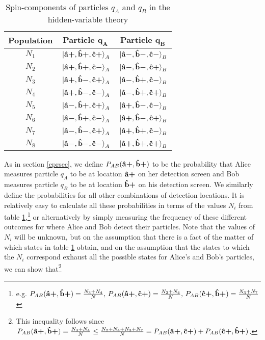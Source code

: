       \begin{table}[ht]
      \caption{Spin-components of particles $q_A$ and $q_B$ in the hidden-variable theory}
      \centering
      \begin{tabular}{c c c} 
      \\ 
      \hline
      \textbf{Population}& \textbf{Particle} $\bm{q_A}$ & \textbf{Particle} $\bm{q_B}$ \\ [0.5ex] 
      \hline
      $N_1$ & $\ket*{\vb{\hat{{a}}}\bm{+},\vb{\hat{{b}}}\bm{+},\vb{\hat{{c}}}\bm{+}}_A$ & $\ket*{\vb{\hat{{a}}}\bm{-},\vb{\hat{{b}}}\bm{-},\vb{\hat{{c}}}\bm{-}}_B$ \\ 
      
      $N_2$ & $\ket*{\vb{\hat{{a}}}\bm{+},\vb{\hat{{b}}}\bm{+},\vb{\hat{{c}}}\bm{-}}_A$ & $\ket*{\vb{\hat{{a}}}\bm{-},\vb{\hat{{b}}}\bm{-},\vb{\hat{{c}}}\bm{+}}_B $\\ 
      
      $N_3$ & $\ket*{\vb{\hat{{a}}}\bm{+},\vb{\hat{{b}}}\bm{-},\vb{\hat{{c}}}\bm{+}}_A$ & $\ket*{\vb{\hat{{a}}}\bm{-},\vb{\hat{{b}}}\bm{+},\vb{\hat{{c}}}\bm{-}}_B$ \\ 
      
      $N_4$ & $\ket*{\vb{\hat{{a}}}\bm{+},\vb{\hat{{b}}}\bm{-},\vb{\hat{{c}}}\bm{-}}_A$ & $\ket*{\vb{\hat{{a}}}\bm{-},\vb{\hat{{b}}}\bm{+},\vb{\hat{{c}}}\bm{+}}_B $\\ 
      
      $N_5$ & $\ket*{\vb{\hat{{a}}}\bm{-},\vb{\hat{{b}}}\bm{+},\vb{\hat{{c}}}\bm{+}}_A$ & $\ket*{\vb{\hat{{a}}}\bm{+},\vb{\hat{{b}}}\bm{-},\vb{\hat{{c}}}\bm{-}}_B$ \\ 
      
      $N_6$ & $\ket*{\vb{\hat{{a}}}\bm{-},\vb{\hat{{b}}}\bm{+},\vb{\hat{{c}}}\bm{-}}_A$ & $\ket*{\vb{\hat{{a}}}\bm{+},\vb{\hat{{b}}}\bm{-},\vb{\hat{{c}}}\bm{+}}_B$ \\ 
      
      $N_7$ & $\ket*{\vb{\hat{{a}}}\bm{-},\vb{\hat{{b}}}\bm{-},\vb{\hat{{c}}}\bm{+}}_A$ & $\ket*{\vb{\hat{{a}}}\bm{+},\vb{\hat{{b}}}\bm{+},\vb{\hat{{c}}}\bm{-} }_B$\\ 
      
      $N_8$ & $\ket*{\vb{\hat{{a}}}\bm{-},\vb{\hat{{b}}}\bm{-},\vb{\hat{{c}}}\bm{-}}_A$ & $\ket*{\vb{\hat{{a}}}\bm{+},\vb{\hat{{b}}}\bm{+},\vb{\hat{{c}}}\bm{+}}_B$ \\ 
      \hline
      \end{tabular}
      \label{hiddentable}
      \end{table}
As in section \ref{eprsec}, we define $P_{AB}(\vb{\hat{{a}}}\bm{+},\vb{\hat{{b}}}\bm{+})$ to be the probability that Alice measures particle $q_A$ to be at location $\vb{\hat{{a}}}\bm{+}$ on her detection screen and Bob measures particle $q_B$ to be at location $\vb{\hat{{b}}}\bm{+}$ on his detection screen. We similarly define the probabilities for all other combinations of detection locations. It is relatively easy to calculate all these probabilities in terms of the values $N_i$ from table \ref{hiddentable},\footnote{e.g.  $P_{AB}(\vb{\hat{{a}}}\bm{+},\vb{\hat{{b}}}\bm{+})=\frac{N_3+N_4}{N},\, P_{AB}(\vb{\hat{{a}}}\bm{+},\vb{\hat{{c}}}\bm{+})=\frac{N_2+N_4}{N},\,P_{AB}(\vb{\hat{{c}}}\bm{+},\vb{\hat{{b}}}\bm{+})=\frac{N_3+N_7}{N}$  } or alternatively by simply measuring the frequency of these different outcomes for where Alice and Bob detect their particles. Note that the values of $N_i$ will be unknown, but on the assumption that there is a fact of the matter of which states in table \ref{hiddentable} obtain, and on the assumption that the states to which the $N_i$ correspond exhaust all the possible states for Alice's and Bob's particles, we can show that\footnote{This inequality follows since $P_{AB}(\vb{\hat{{a}}}\bm{+},\vb{\hat{{b}}}\bm{+})=\frac{N_3+N_4}{N}\leq \frac{N_2+N_4+N_3+N_7}{N}=P_{AB}(\vb{\hat{{a}}}\bm{+},\vb{\hat{{c}}}\bm{+})+P_{AB}(\vb{\hat{{c}}}\bm{+},\vb{\hat{{b}}}\bm{+})$.}
